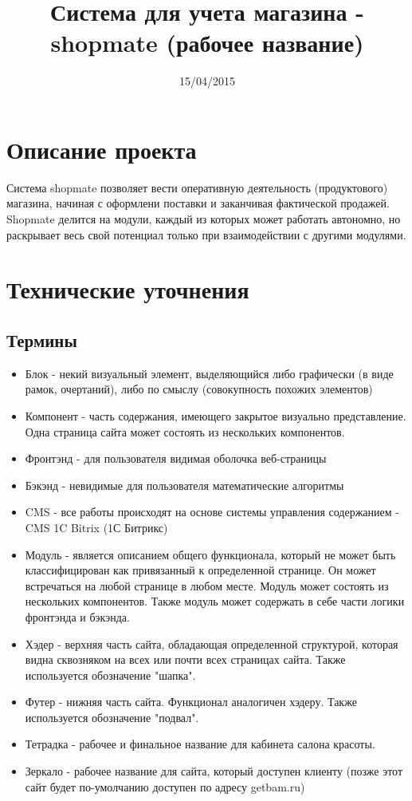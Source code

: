 \documentclass[DIV=calc, paper=a4, fontsize=11pt]{scrartcl} %
\title{Система для учета магазина - shopmate (рабочее название)}
\date{15/04/2015}
\begin{document}
\maketitle

\section{Описание проекта}
Система shopmate позволяет вести оперативную деятельность (продуктового) магазина, начиная с оформлени поставки и заканчивая фактической продажей. Shopmate делится на модули, каждый из которых может работать автономно, но раскрывает весь свой потенциал только при взаимодействии с другими модулями. 

\section{Технические уточнения}

\subsection{Термины}

        \begin{itemize}
        \item Блок - некий визуальный элемент, выделяющийся либо графически (в виде рамок, очертаний), либо по смыслу (совокупность похожих элементов)
        \item Компонент - часть содержания, имеющего закрытое визуально представление. Одна страница сайта может состоять из нескольких компонентов.
        \item Фронтэнд - для пользователя видимая оболочка веб-страницы
        \item Бэкэнд - невидимые для пользователя математические алгоритмы
        \item CMS - все работы происходят на основе системы управления содержанием - CMS 1C Bitrix (1С Битрикс)
        \item Модуль - является описанием общего функционала, который не может быть классифицирован как привязанный к определенной странице. Он может встречаться на любой странице в любом месте. Модуль может состоять из нескольких компонентов. Также модуль может содержать в себе части логики фронтэнда и бэкэнда.
        \item Хэдер - верхняя часть сайта, обладающая определенной структурой, которая видна сквозняком на всех или почти всех страницах сайта. Также используется обозначение "шапка".
        \item Футер - нижняя часть сайта. Функционал аналогичен хэдеру. Также используется обозначение "подвал".
        \item Тетрадка - рабочее и финальное название для кабинета салона красоты.
        \item Зеркало - рабочее название для сайта, который доступен клиенту (позже этот сайт будет по-умолчанию доступен по адресу getbam.ru)
    \end{itemize}
\end{document}
